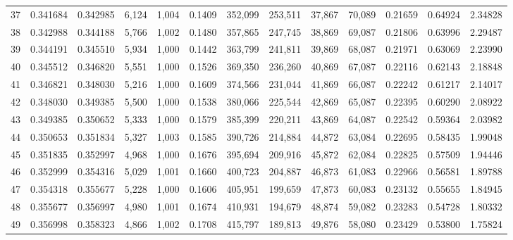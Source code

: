 \begin{tabular}{rrrrrrrrrrrrr}
37  &  0.341684 &  0.342985 &   6,124 &  1,004 &                                     0.1409 &  352,099 &  253,511 &   37,867 &   70,089 &  0.21659 &  0.64924 &  2.34828 \\
38  &  0.342988 &  0.344188 &   5,766 &  1,002 &                                     0.1480 &  357,865 &  247,745 &   38,869 &   69,087 &  0.21806 &  0.63996 &  2.29487 \\
39  &  0.344191 &  0.345510 &   5,934 &  1,000 &                                     0.1442 &  363,799 &  241,811 &   39,869 &   68,087 &  0.21971 &  0.63069 &  2.23990 \\
40  &  0.345512 &  0.346820 &   5,551 &  1,000 &                                     0.1526 &  369,350 &  236,260 &   40,869 &   67,087 &  0.22116 &  0.62143 &  2.18848 \\
41  &  0.346821 &  0.348030 &   5,216 &  1,000 &                                     0.1609 &  374,566 &  231,044 &   41,869 &   66,087 &  0.22242 &  0.61217 &  2.14017 \\
42  &  0.348030 &  0.349385 &   5,500 &  1,000 &                                     0.1538 &  380,066 &  225,544 &   42,869 &   65,087 &  0.22395 &  0.60290 &  2.08922 \\
43  &  0.349385 &  0.350652 &   5,333 &  1,000 &                                     0.1579 &  385,399 &  220,211 &   43,869 &   64,087 &  0.22542 &  0.59364 &  2.03982 \\
44  &  0.350653 &  0.351834 &   5,327 &  1,003 &                                     0.1585 &  390,726 &  214,884 &   44,872 &   63,084 &  0.22695 &  0.58435 &  1.99048 \\
45  &  0.351835 &  0.352997 &   4,968 &  1,000 &                                     0.1676 &  395,694 &  209,916 &   45,872 &   62,084 &  0.22825 &  0.57509 &  1.94446 \\
46  &  0.352999 &  0.354316 &   5,029 &  1,001 &                                     0.1660 &  400,723 &  204,887 &   46,873 &   61,083 &  0.22966 &  0.56581 &  1.89788 \\
47  &  0.354318 &  0.355677 &   5,228 &  1,000 &                                     0.1606 &  405,951 &  199,659 &   47,873 &   60,083 &  0.23132 &  0.55655 &  1.84945 \\
48  &  0.355677 &  0.356997 &   4,980 &  1,001 &                                     0.1674 &  410,931 &  194,679 &   48,874 &   59,082 &  0.23283 &  0.54728 &  1.80332 \\
49  &  0.356998 &  0.358323 &   4,866 &  1,002 &                                     0.1708 &  415,797 &  189,813 &   49,876 &   58,080 &  0.23429 &  0.53800 &  1.75824 \\

\end{tabular}
